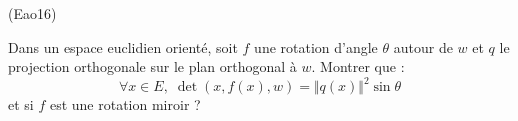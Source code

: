 \begin{tiny}(Eao16)\end{tiny} Dans un espace euclidien orienté, soit $f$ une rotation d'angle $\theta$ autour de $w$ et $q$ le projection orthogonale sur le plan orthogonal à $w$. Montrer que :
\begin{displaymath}
 \forall x\in E,\;\det(x,f(x),w)=\Vert q(x) \Vert^2 \sin \theta
\end{displaymath}
et si $f$ est une rotation miroir ?